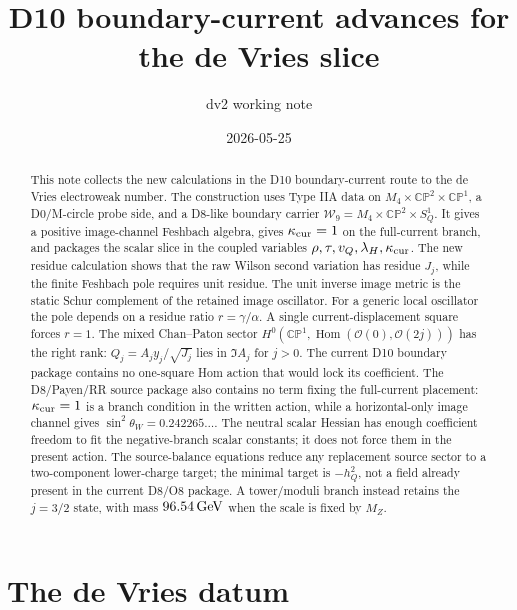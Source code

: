 \documentclass[11pt]{article}
\title{D10 boundary-current advances for the de Vries slice}
\author{dv2 working note}
\date{2026-05-25}
\newcommand{\CP}{\mathbb{CP}}
\newcommand{\OO}{\mathcal{O}}
\newcommand{\WW}{\mathcal{W}}
\theoremstyle{plain}
\theoremstyle{definition}
\begin{document}
\maketitle

\begin{abstract}
This note collects the new calculations in the D10 boundary-current route to
the de Vries electroweak number.  The construction uses Type IIA data on
\(M_4\times\CP^2\times\CP^1\), a D0/M-circle probe side, and a D8-like
boundary carrier \(\WW_9=M_4\times\CP^2\times S^1_Q\).  It gives a
positive image-channel Feshbach algebra, gives \(\kappa_{\rm cur}=1\) on the
full-current branch, and packages the scalar slice in the
coupled variables \(\rho,\tau,v_Q,\lambda_H,\kappa_{\rm cur}\).  The new
residue calculation shows that the raw Wilson second variation has residue
\(J_j\), while the finite Feshbach pole requires unit residue.  The unit inverse
image metric is the static Schur complement of the retained image oscillator.
For a generic local oscillator the pole depends on a residue ratio
\(r=\gamma/\alpha\).  A single current-displacement square forces \(r=1\).
The mixed Chan--Paton sector \(H^0(\CP^1,\operatorname{Hom}(\OO(0),\OO(2j)))\)
has the right rank: \(Q_j=A_jy_j/\sqrt{J_j}\) lies in \(\Im A_j\) for
\(j>0\).  The current D10 boundary package contains no one-square Hom action
that would lock its coefficient.
The D8/Payen/RR source package also contains no term fixing the full-current placement:
\(\kappa_{\rm cur}=1\) is a branch condition in the written action, while a
horizontal-only image channel gives \(\sin^2\theta_W=0.242265\ldots\).
The neutral scalar Hessian has enough coefficient freedom to fit the
negative-branch scalar constants; it does not force them in the present action.
The source-balance equations reduce any replacement source sector to a
two-component lower-charge target; the minimal target is \(-h_Q^2\), not a
field already present in the current D8/O8 package.
A tower/moduli branch instead retains the \(j=3/2\) state, with mass
\(96.54\,{\rm GeV}\) when the scale is fixed by \(M_Z\).
\end{abstract}


\section{The de Vries datum}
\end{document}
